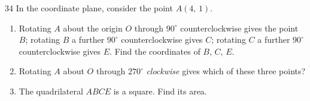 \begin{probbox}{34}{}
In the coordinate plane, consider the point $A(4,\,1)$.
\begin{enumerate}[label=\alph*),leftmargin=1.6em,itemsep=0pt,topsep=2pt]
  \item Rotating $A$ about the origin $O$ through $90^\circ$ counterclockwise gives the point $B$; rotating $B$ a further $90^\circ$ counterclockwise gives $C$; rotating $C$ a further $90^\circ$ counterclockwise gives $E$. Find the coordinates of $B$, $C$, $E$.
  \item Rotating $A$ about $O$ through $270^\circ$ \emph{clockwise} gives which of these three points?
  \item The quadrilateral $ABCE$ is a square. Find its area.
\end{enumerate}
\end{probbox}
